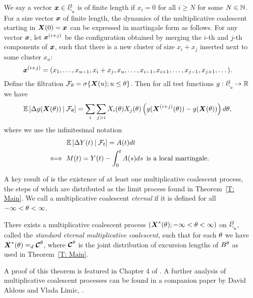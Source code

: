 We say a vector $\boldsymbol{x} \in \mathit{l}^2_{\searrow}$ is of finite length if $x_i = 0$ for all $i \geq N$ for some $N \in \mathbb{N}$.
For a size vector $\boldsymbol{x}$ of finite length,
the dynamics of the multiplicative coalescent starting in $\boldsymbol{X}(0) = \boldsymbol{x}$ can be expressed in martingale form as follows.
For any vector $\boldsymbol{x}$, let $\boldsymbol{x}^{(i+j)}$ be the configuration obtained by merging the $i$-th and $j$-th components of $\boldsymbol{x}$,
such that there is a new cluster of size $x_i + x_j$ inserted next to some cluster $x_u$:
\begin{equation}
	\boldsymbol{x}^{(i+j)} = (x_1, \dots, x_{u-1}, x_i + x_j, x_u, \dots, x_{i-1}, x_{i+1}, \dots, x_{j-1}, x_{j+1}, \dots).
\end{equation}
Define the filtration $\mathcal{F}_{\theta} = \sigma\{ \boldsymbol{X}(u); u \leq \theta \}$.
Then for all test functions $g: \mathit{l}^2_{\searrow} \rightarrow \mathbb{R}$ we have
\begin{equation}
	\mathbb{E} \left[ \Delta g(\boldsymbol{X}(\theta)) \: | \: \mathcal{F}_{\theta} \right]
	= \sum_i \sum_{j > i} X_i(\theta) X_j(\theta) \left( g(\boldsymbol{X}^{(i+j)}(\theta)) - g(\boldsymbol{X}(\theta)) \right)d\theta,
\end{equation}
where we use the infinitesimal notation
\begin{equation}
\begin{aligned}
	&\qquad \quad \mathbb{E} \left[ \Delta Y(t) \: | \: \mathcal{F}_{t} \right] = A(t)dt \\ 
	&\iff M(t) = Y(t) - \int_{0}^{t}A(s)ds \enspace \text{is a local martingale.}
\end{aligned}
\end{equation}

A key result of \cite{Aldous.1997} is the existence of at least one multiplicative coalescent process, 
the steps of which are distributed as the limit process found in Theorem~\ref{T: Main}.
We call a multiplicative coalescent \emph{eternal} if it is defined for all $-\infty < \theta < \infty$.

\begin{theorem}
	There exists a multiplicative coalescent process
	$ (\boldsymbol{X}^*(\theta); -\infty < \theta < \infty)$ on $\mathit{l}^2_{\searrow}$,
	called the \emph{standard eternal multiplicative coalescent},
	such that for each $\theta$ we have $\boldsymbol{X}^*(\theta) =_d \boldsymbol{\mathcal{C}}^{\theta}$,
	where $\boldsymbol{\mathcal{C}}^{\theta}$ is the joint distribution of excursion lengths of $B^{\theta}$ as used in Theorem~\ref{T: Main}.
\end{theorem}

A proof of this theorem is featured in Chapter 4 of \cite{Aldous.1997}.
A further analysis of multiplicative coalescent processes can be found in a companion paper by David Aldous and Vlada Limic, \cite{Aldous.1998}.





